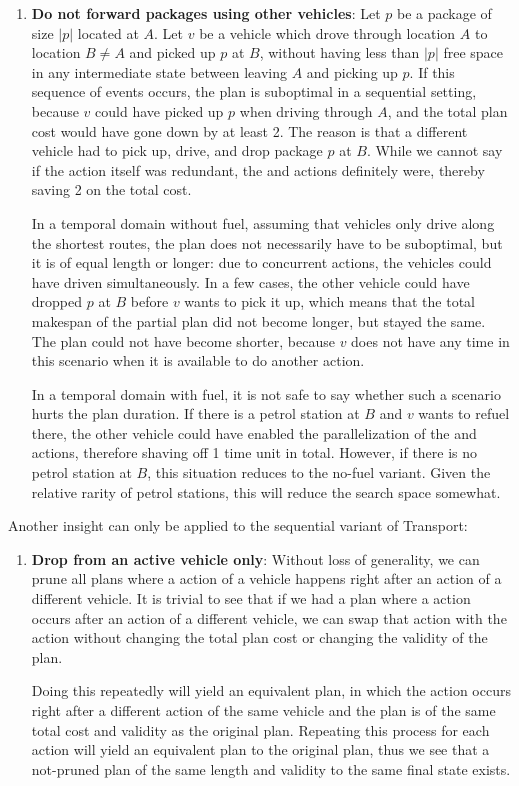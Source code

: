 \begin{enumerate}
\item \textbf{Do not forward packages using other vehicles}:
Let $p$ be a package of size $|p|$ located at $A$.
Let $v$ be a vehicle which drove through location $A$ to location $B \neq A$
and picked up $p$ at $B$,
without having less than $|p|$ free space in any intermediate state between leaving $A$ and picking up $p$.
If this sequence of events occurs, the plan is suboptimal in a sequential setting, because
$v$ could have picked up $p$ when driving through $A$, and the total plan cost
would have gone down by at least 2. The reason is that a different vehicle had to pick up, drive, and drop package $p$ at $B$.
While we cannot say if the \drive{} action itself
was redundant, the \pickup{} and \drop{} actions definitely were, thereby saving
2 on the total cost. 

In a temporal domain without fuel, assuming that vehicles only drive along the shortest routes,
the plan does not necessarily have to be suboptimal, but it
is of equal length or longer: due to concurrent actions, the vehicles could have driven simultaneously.
In a few cases, the other vehicle could have dropped $p$ at $B$ before $v$ wants to pick it up,
which means that the total makespan of the partial plan did not become longer, but stayed the same.
The plan could not have become shorter, because $v$ does not have any time in this scenario when it is available to do another action.

In a temporal domain with fuel, it is not safe to say whether
such a scenario hurts the plan duration. If there is a petrol station at $B$
and $v$ wants to refuel there, the other vehicle could have enabled the parallelization 
of the  and \pickup{} actions, therefore shaving off 1 time unit in total.
However, if there is no petrol
station at $B$, this situation reduces to the no-fuel variant. Given the relative rarity of petrol stations, this will reduce the search space somewhat.
\end{enumerate}
Another insight can only be applied to the sequential variant of Transport:
\begin{enumerate}
\item \textbf{Drop from an active vehicle only}: Without loss of generality,
we can prune all plans where a \drop{} action of a vehicle happens
right after an action of a different vehicle. It is trivial to see that if we had a plan where
a \drop{} action
occurs after an action of a different vehicle, we can swap that action with the \drop{} action without changing the total plan cost or changing the validity of the plan.

Doing this repeatedly will yield an equivalent plan, in which the \drop{} action
occurs right after a different action of the same vehicle and the plan is of the same total cost and validity as the original plan. Repeating this process for each \drop{} action will yield an equivalent plan to the original plan, thus we see that a not-pruned plan of the same length and validity to the same final state exists.
\end{enumerate}

